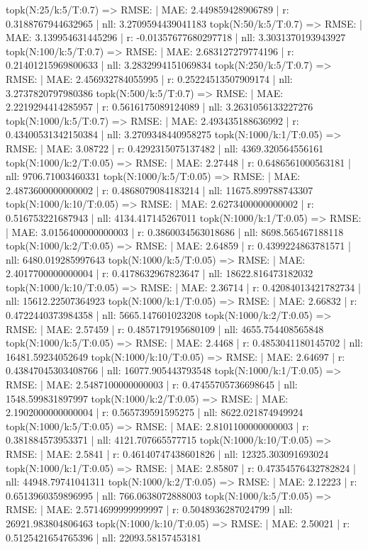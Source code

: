 topk(N:25/k:5/T:0.7) => RMSE: | MAE: 2.449859428906789 | r: 0.3188767944632965 | nll: 3.2709594439041183
topk(N:50/k:5/T:0.7) => RMSE: | MAE: 3.139954631445296 | r: -0.01357677680297718 | nll: 3.3031370193943927
topk(N:100/k:5/T:0.7) => RMSE: | MAE: 2.683127279774196 | r: 0.21401215969800633 | nll: 3.2832994151069834
topk(N:250/k:5/T:0.7) => RMSE: | MAE: 2.456932784055995 | r: 0.25224513507909174 | nll: 3.2737820797980386
topk(N:500/k:5/T:0.7) => RMSE: | MAE: 2.2219294414285957 | r: 0.5616175089124089 | nll: 3.2631056133227276
topk(N:1000/k:5/T:0.7) => RMSE: | MAE: 2.493435188636992 | r: 0.43400531342150384 | nll: 3.2709348440958275
topk(N:1000/k:1/T:0.05) => RMSE: | MAE: 3.08722 | r: 0.4292315075137482 | nll: 4369.320564556161
topk(N:1000/k:2/T:0.05) => RMSE: | MAE: 2.27448 | r: 0.6486561000563181 | nll: 9706.71003460331
topk(N:1000/k:5/T:0.05) => RMSE: | MAE: 2.4873600000000002 | r: 0.4868079084183214 | nll: 11675.899788743307
topk(N:1000/k:10/T:0.05) => RMSE: | MAE: 2.6273400000000002 | r: 0.516753221687943 | nll: 4134.417145267011
topk(N:1000/k:1/T:0.05) => RMSE: | MAE: 3.0156400000000003 | r: 0.3860034563018686 | nll: 8698.565467188118
topk(N:1000/k:2/T:0.05) => RMSE: | MAE: 2.64859 | r: 0.4399224863781571 | nll: 6480.019285997643
topk(N:1000/k:5/T:0.05) => RMSE: | MAE: 2.4017700000000004 | r: 0.4178632967823647 | nll: 18622.816473182032
topk(N:1000/k:10/T:0.05) => RMSE: | MAE: 2.36714 | r: 0.42084013421782734 | nll: 15612.22507364923
topk(N:1000/k:1/T:0.05) => RMSE: | MAE: 2.66832 | r: 0.4722440373984358 | nll: 5665.147601023208
topk(N:1000/k:2/T:0.05) => RMSE: | MAE: 2.57459 | r: 0.4857179195680109 | nll: 4655.754408565848
topk(N:1000/k:5/T:0.05) => RMSE: | MAE: 2.4468 | r: 0.4853041180145702 | nll: 16481.59234052649
topk(N:1000/k:10/T:0.05) => RMSE: | MAE: 2.64697 | r: 0.43847045303408766 | nll: 16077.905443793548
topk(N:1000/k:1/T:0.05) => RMSE: | MAE: 2.5487100000000003 | r: 0.47455705736698645 | nll: 1548.599831897997
topk(N:1000/k:2/T:0.05) => RMSE: | MAE: 2.1902000000000004 | r: 0.565739591595275 | nll: 8622.021874949924
topk(N:1000/k:5/T:0.05) => RMSE: | MAE: 2.8101100000000003 | r: 0.381884573953371 | nll: 4121.707665577715
topk(N:1000/k:10/T:0.05) => RMSE: | MAE: 2.5841 | r: 0.46140747438601826 | nll: 12325.303091693024
topk(N:1000/k:1/T:0.05) => RMSE: | MAE: 2.85807 | r: 0.47354576432782824 | nll: 44948.79741041311
topk(N:1000/k:2/T:0.05) => RMSE: | MAE: 2.12223 | r: 0.6513960359896995 | nll: 766.0638072888003
topk(N:1000/k:5/T:0.05) => RMSE: | MAE: 2.5714699999999997 | r: 0.5048936287024799 | nll: 26921.983804806463
topk(N:1000/k:10/T:0.05) => RMSE: | MAE: 2.50021 | r: 0.5125421654765396 | nll: 22093.58157453181
